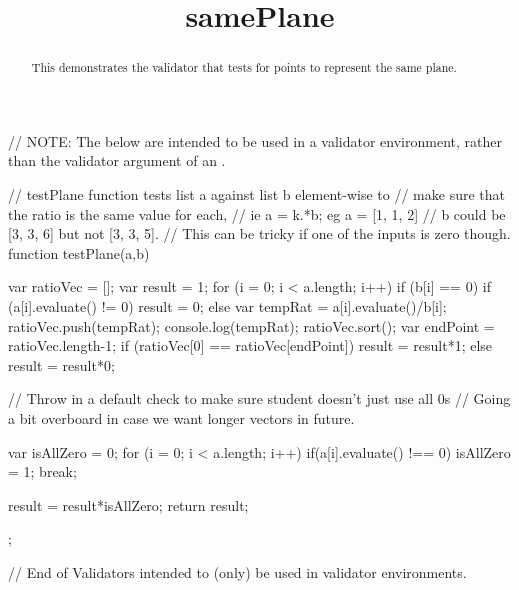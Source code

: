 \documentclass{ximera}
\title{samePlane}
\begin{document}
\begin{abstract}
    This demonstrates the validator that tests for points to represent the same plane.
\end{abstract}
\maketitle

\begin{javascript}
// NOTE: The below are intended to be used in a validator environment, rather than the validator argument of an \answer.

// testPlane function tests list a against list b element-wise to 
// make sure that the ratio is the same value for each, 
// ie a = k.*b; eg a = [1, 1, 2] 
// b could be [3, 3, 6] but not [3, 3, 5]. 
// This can be tricky if one of the inputs is zero though.
function testPlane(a,b) {
	var ratioVec = [];
	var result = 1;
	for (i = 0; i < a.length; i++) {
		if (b[i] == 0) {
			if (a[i].evaluate() != 0){
				result = 0;
			}
		}
		else {
			var tempRat = a[i].evaluate()/b[i];
			ratioVec.push(tempRat);
			console.log(tempRat);
		}
	}
	ratioVec.sort();
	var endPoint = ratioVec.length-1;
	if (ratioVec[0] == ratioVec[endPoint]) {
		result = result*1;
	}
	else {
		result = result*0;
	}
    
    // Throw in a default check to make sure student doesn't just use all 0s
    // Going a bit overboard in case we want longer vectors in future.
    
    var isAllZero = 0;
    for (i = 0; i < a.length; i++) {
      if(a[i].evaluate() !== 0) {
        isAllZero = 1;
        break;
      }
    }
    
    result = result*isAllZero;
	return result;
};


// End of Validators intended to (only) be used in validator environments.

\end{javascript}

\end{document}
